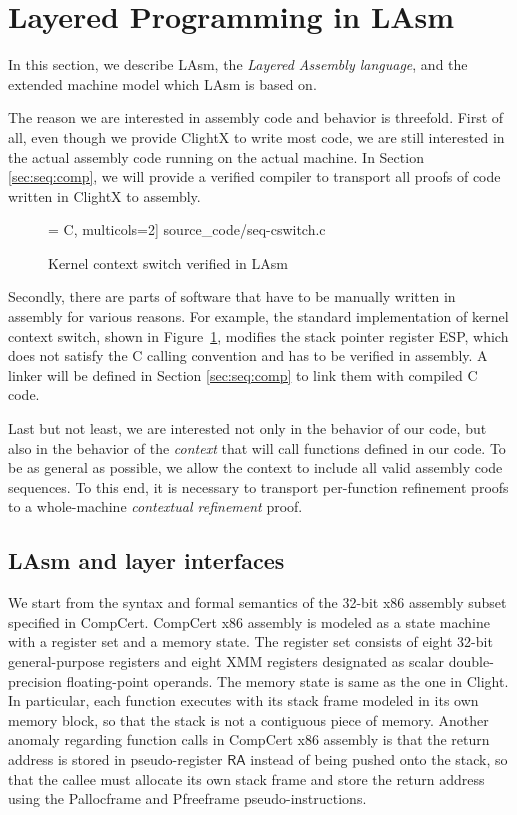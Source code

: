 
\section{Layered Programming in LAsm}
\label{sec:seq:lasm}

In this section, we describe LAsm, the \emph{Layered
  Assembly language}, and the extended machine model which LAsm is based on.

The reason we are interested in assembly code and behavior is
threefold.  First of all, even though we provide ClightX to write most
code, we are still interested in the actual assembly code running on
the actual machine. In Section \ref{sec:seq:comp}, we will provide a
verified compiler to transport all proofs of code written in ClightX
to assembly.

\begin{figure}[t]\centering
 = C, multicols=2] {source_code/seq-cswitch.c}
\caption{Kernel context switch verified in LAsm}
\label{fig:contextswitch}
\hrulefill
\end{figure}

Secondly, there are parts of software that have to be manually written
in assembly for various reasons. For example, the standard
implementation of kernel context switch, shown in
Figure~\ref{fig:contextswitch}, 
modifies the stack pointer register
\textsf{ESP}, which does not satisfy the C calling convention and has
to be verified in assembly.  A linker will be defined in Section
\ref{sec:seq:comp} to link them with compiled C code.

Last but not least, we are interested not only in the behavior of our
code, but also in the behavior of the \emph{context} that will call
functions defined in our code. To be as general as possible, we allow
the context to include all valid assembly code sequences. To this end,
it is necessary to transport per-function refinement proofs to a
whole-machine \emph{contextual refinement} proof.


  \subsection{LAsm and layer interfaces}

We start from the syntax and formal semantics of the 32-bit x86
assembly subset specified in CompCert.
CompCert x86 assembly is
modeled as a state machine with a register set and a memory state. 
The register set
consists of eight 32-bit general-purpose registers and eight XMM registers
designated as scalar double-precision floating-point operands.
The memory state is same as the one in Clight.
In particular, each function executes with its stack frame modeled in its
own memory block, so that the stack is not a contiguous piece of
memory.
Another anomaly regarding function calls in CompCert x86 assembly is that
the return address is stored in pseudo-register $\mathsf{RA}$ instead of
being pushed onto the stack, so
that the callee must allocate its own stack frame and
store the return address 
using the \textsf{Pallocframe} and
\textsf{Pfreeframe} pseudo-instructions.

